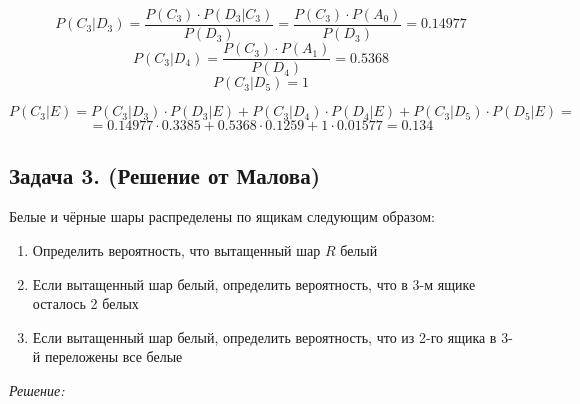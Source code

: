 \begin{enumerate}
	\[ P(C_3|D_3) = \dfrac{P(C_3) \cdot P(D_3|C_3)}{P(D_3)} = \dfrac{P(C_3) \cdot P(A_0)}{P(D_3)} = 0.14977 \]
	\[ P(C_3|D_4) = \dfrac{P(C_3) \cdot P(A_1)}{P(D_4)} = 0.5368 \]
	\[ P(C_3|D_5) = 1 \]
	
	\[ P(C_3|E) = P(C_3|D_3) \cdot P(D_3|E) + P(C_3|D_4) \cdot P(D_4|E) + P(C_3|D_5) \cdot P(D_5|E) = \]
	\[ = 0.14977 \cdot 0.3385 + 0.5368 \cdot 0.1259 + 1 \cdot 0.01577 = 0.134 \]
\end{enumerate}

\subsection*{Задача 3. (Решение от Малова)}

Белые и чёрные шары распределены по ящикам следующим образом:

\begin{figure}[H]
\end{figure}

\begin{enumerate}
	\item Определить вероятность, что вытащенный шар $R$ белый
	\item Если вытащенный шар белый, определить вероятность, что в 3-м ящике осталось 2 белых
	\item Если вытащенный шар белый, определить вероятность, что из 2-го ящика в 3-й переложены все белые
\end{enumerate}

\textit{Решение:}

